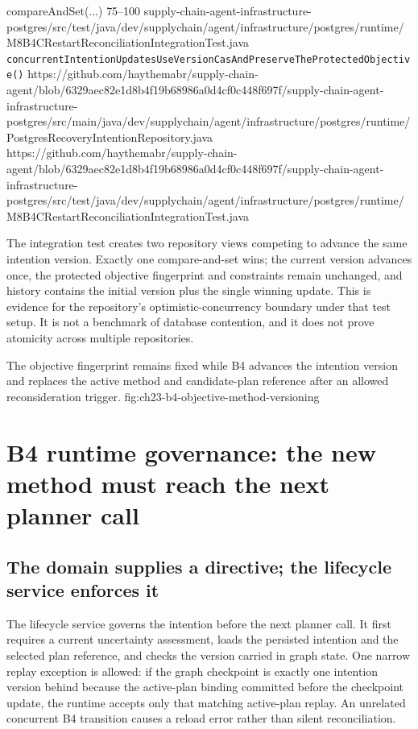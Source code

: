   {compareAndSet(...)}
  {75--100}
  {supply-chain-agent-infrastructure-postgres/src/test/java/dev/supplychain/agent/infrastructure/postgres/runtime/M8B4CRestartReconciliationIntegrationTest.java}
  {\texttt{concurrentIntentionUpdatesUseVersionCasAndPreserveTheProtectedObjective()}}
  {https://github.com/haythemabr/supply-chain-agent/blob/6329aec82e1d8b4f19b68986a0d4cf0c448f697f/supply-chain-agent-infrastructure-postgres/src/main/java/dev/supplychain/agent/infrastructure/postgres/runtime/PostgresRecoveryIntentionRepository.java}
  {https://github.com/haythemabr/supply-chain-agent/blob/6329aec82e1d8b4f19b68986a0d4cf0c448f697f/supply-chain-agent-infrastructure-postgres/src/test/java/dev/supplychain/agent/infrastructure/postgres/runtime/M8B4CRestartReconciliationIntegrationTest.java}

The integration test creates two repository views competing to advance the same intention version. Exactly one compare-and-set wins; the current version advances once, the protected objective fingerprint and constraints remain unchanged, and history contains the initial version plus the single winning update. This is evidence for the repository's optimistic-concurrency boundary under that test setup. It is not a benchmark of database contention, and it does not prove atomicity across multiple repositories.

  {The objective fingerprint remains fixed while B4 advances the intention version and replaces the active method and candidate-plan reference after an allowed reconsideration trigger.}
  {fig:ch23-b4-objective-method-versioning}

\section{B4 runtime governance: the new method must reach the next planner call}
\label{sec:ch23-b4-runtime-governance}

\subsection{The domain supplies a directive; the lifecycle service enforces it}
\label{subsec:ch23-b4-govern-intention}

The lifecycle service governs the intention before the next planner call. It first requires a current uncertainty assessment, loads the persisted intention and the selected plan reference, and checks the version carried in graph state. One narrow replay exception is allowed: if the graph checkpoint is exactly one intention version behind because the active-plan binding committed before the checkpoint update, the runtime accepts only that matching active-plan replay. An unrelated concurrent B4 transition causes a reload error rather than silent reconciliation.

